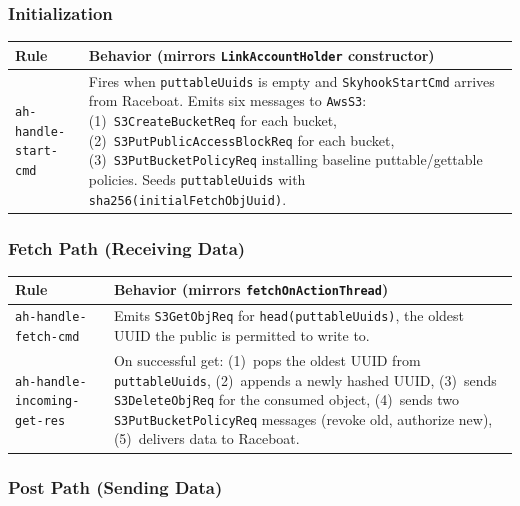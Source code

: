 \documentclass[11pt]{article}
\begin{document}
\subsubsection{Initialization}

\begin{table}[H]
\centering
\small
\begin{tabular}{@{}lp{8.5cm}@{}}
\toprule
\textbf{Rule} & \textbf{Behavior (mirrors \texttt{LinkAccountHolder} constructor)} \\
\midrule
\texttt{ah-handle-start-cmd}
  & Fires when \texttt{puttableUuids} is empty and \texttt{SkyhookStartCmd} arrives from Raceboat.  Emits six messages to \texttt{AwsS3}:
    (1)~\texttt{S3CreateBucketReq} for each bucket,
    (2)~\texttt{S3PutPublicAccessBlockReq} for each bucket,
    (3)~\texttt{S3PutBucketPolicyReq} installing baseline puttable/gettable policies.
    Seeds \texttt{puttableUuids} with \texttt{sha256(initialFetchObjUuid)}. \\
\bottomrule
\end{tabular}
\end{table}

\subsubsection{Fetch Path (Receiving Data)}

\begin{table}[H]
\centering
\small
\begin{tabular}{@{}lp{8.5cm}@{}}
\toprule
\textbf{Rule} & \textbf{Behavior (mirrors \texttt{fetchOnActionThread})} \\
\midrule
\texttt{ah-handle-fetch-cmd}
  & Emits \texttt{S3GetObjReq} for \texttt{head(puttableUuids)}, the oldest UUID the public is permitted to write to. \\
\texttt{ah-handle-incoming-get-res}
  & On successful get: (1)~pops the oldest UUID from \texttt{puttableUuids}, (2)~appends a newly hashed UUID, (3)~sends \texttt{S3DeleteObjReq} for the consumed object, (4)~sends two \texttt{S3PutBucketPolicyReq} messages (revoke old, authorize new), (5)~delivers data to Raceboat. \\
\bottomrule
\end{tabular}
\end{table}

\subsubsection{Post Path (Sending Data)}
\end{document}

